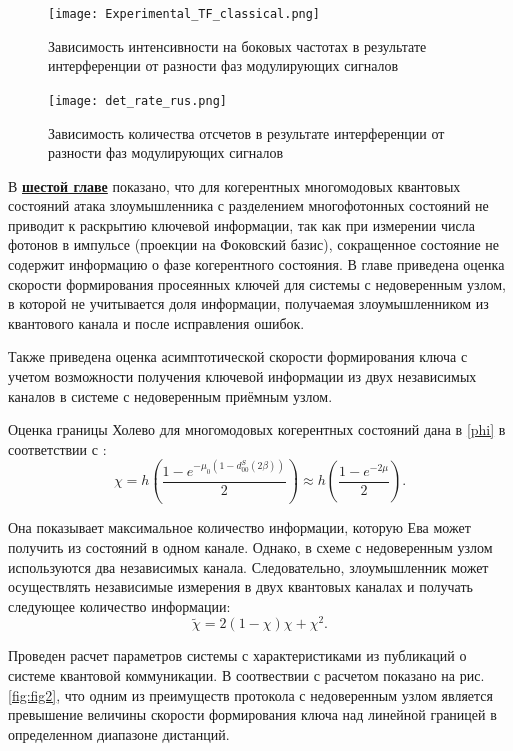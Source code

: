  \begin{figure}[ht]
  \centering
  \texttt{[image: Experimental\_TF\_classical.png]}
  \caption{Зависимость интенсивности на боковых частотах в результате интерференции от разности фаз модулирующих сигналов}
  \label{fig:Experimental_TF_classical_ref}
\end{figure}


 \begin{figure}[ht]
  \centering
  \texttt{[image: det\_rate\_rus.png]}
  \caption{Зависимость количества отсчетов в результате интерференции от разности фаз модулирующих сигналов}
  \label{fig:det_rate_TF_RUS_ref}
\end{figure}


 В \underline{\textbf{шестой главе}} показано, что для когерентных многомодовых квантовых состояний атака злоумышленника с разделением многофотонных состояний не приводит к раскрытию ключевой информации, так как при измерении числа фотонов в импульсе (проекции на Фоковский базис), сокращенное состояние не содержит информацию о фазе когерентного состояния. В главе приведена оценка скорости формирования просеянных ключей для системы с недоверенным узлом, в которой не учитывается доля информации, получаемая злоумышленником из квантового канала и после исправления ошибок.
 
 
  Также приведена оценка асимптотической скорости формирования ключа с учетом возможности получения ключевой информации из двух независимых каналов в системе с недоверенным приёмным узлом. 
 
 Оценка границы Холево для многомодовых когерентных состояний дана в \ref{phi} в соответствии с \cite{kozubov2019finite}:
\begin{equation}
    \chi=h\left(\frac{1-e^{-\mu_0(1-d^S_{00}(2\beta))}}{2}\right)\approx h\left(\frac{1-e^{-2\mu}}{2}\right).
\end{equation}

Она показывает максимальное количество информации, которую Ева может получить из состояний в одном канале. Однако, в схеме с недоверенным узлом используются два независимых канала. Следовательно, злоумышленник может осуществлять независимые измерения в двух квантовых каналах и получать следующее количество информации:
\begin{equation}
    \tilde{\chi}=2(1-\chi)\chi+\chi^2.
\end{equation}

 Проведен расчет параметров системы с характеристиками из публикаций о системе квантовой коммуникации. В соотвествии с расчетом показано на рис. \ref{fig:fig2}, что одним из преимуществ протокола с недоверенным узлом является превышение величины скорости формирования ключа над линейной границей в определенном диапазоне дистанций.


